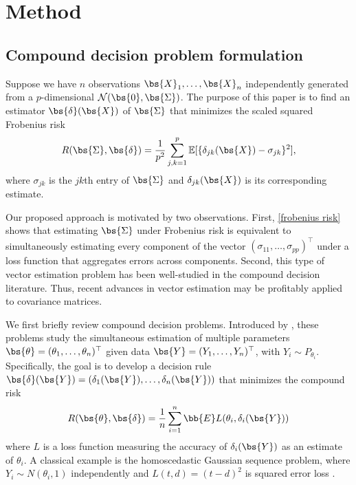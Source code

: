 \section{\label{sec:method}Method}
\subsection{\label{sec:compound}Compound decision problem formulation}
Suppose we have $n$ observations $\bs{X}_1,\ldots,\bs{X}_n$ independently generated from a $p$-dimensional $\mathcal{N}(\bs{0},\bs{\Sigma})$. The purpose of this paper is to find an estimator $\bs{\delta}(\bs{X})$ of $\bs{\Sigma}$ that minimizes the scaled squared Frobenius risk
\begin{equation}
\label{frobenius risk}
R(\bs{\Sigma}, \bs{\delta}) = \frac{1}{p^2} \sum_{j,k=1}^p \mathbb{E}[\{\delta_{jk}(\bs{X})-\sigma_{jk}\}^2],
\end{equation}
where $\sigma_{jk}$ is the $jk$th entry of $\bs{\Sigma}$ and $\delta_{jk}(\bs{X})$ is its corresponding estimate.

Our proposed approach is motivated by two observations. First, \eqref{frobenius risk} shows that estimating $\bs{\Sigma}$ under Frobenius risk is equivalent to simultaneously estimating every component of the vector $(\sigma_{11},\ldots,\sigma_{pp})^\top$ under a loss function that aggregates errors across components. Second, this type of vector estimation problem has been well-studied in the compound decision literature. Thus, recent advances in vector estimation may be profitably applied to covariance matrices.

We first briefly review compound decision problems. Introduced by \citet{robbins1951asymptotically}, these problems study the simultaneous estimation of multiple parameters $\bs{\theta} = (\theta_1, \ldots, \theta_n)^\top$ given data $\bs{Y} = (Y_1, \ldots, Y_n)^\top$, with $Y_i\sim P_{\theta_i}$. Specifically, the goal is to develop a decision rule $\bs{\delta}(\bs{Y}) = (\delta_1(\bs{Y}),\ldots,\delta_n(\bs{Y}))$ that minimizes the compound risk
\begin{equation}
\label{compound risk}
R(\bs{\theta},\bs{\delta}) = \frac{1}{n}\sum_{i=1}^n \bb{E} L(\theta_i,\delta_i(\bs{Y}))
\end{equation}
where $L$ is a loss function measuring the accuracy of $\delta_i(\bs{Y})$ as an estimate of $\theta_i$. A classical example is the homoscedastic Gaussian sequence problem, where $Y_i \sim N(\theta_i, 1)$ independently and $L(t, d) = (t - d)^2$ is squared error loss \citep{johnstone2017gaussian}.

